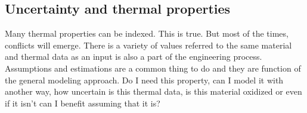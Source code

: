 \documentclass[final]{cubedoc}
\begin{document}
	
	\subsection{Uncertainty and thermal properties}
	
	
	
	Many thermal properties can be indexed. This is true. But most of the times, conflicts will emerge. There is a variety of values referred to the same material and thermal data as an input is also a part of the engineering process. Assumptions and estimations are a common thing to do and they are function of the general modeling approach. Do I need this property, can I model it with another way, how uncertain is this thermal data, is this material oxidized or even if it isn't can I benefit assuming that it is? 
	
\end{document}
